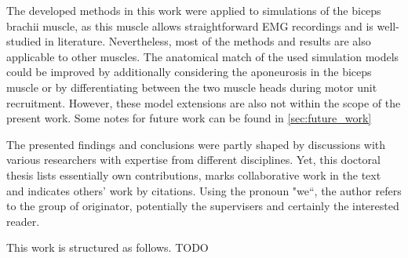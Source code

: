 The developed methods in this work were applied to simulations of the biceps brachii muscle, as this muscle allows straightforward EMG recordings and is well-studied in literature. Nevertheless, most of the methods and results are also applicable to other muscles. The anatomical match of the used simulation models could be improved by additionally considering the aponeurosis in the biceps muscle or by differentiating between the two muscle heads during motor unit recruitment. However, these model extensions are also not within the scope of the present work.
Some notes for future work can be found in \cref{sec:future_work}

The presented findings and conclusions were partly shaped by discussions with various researchers with expertise from different disciplines. Yet, this doctoral thesis lists essentially own contributions, marks collaborative work in the text and indicates others' work by citations.
Using the pronoun "we``, the author refers to the group of originator, potentially the supervisers and certainly the interested reader.

This work is structured as follows. TODO







